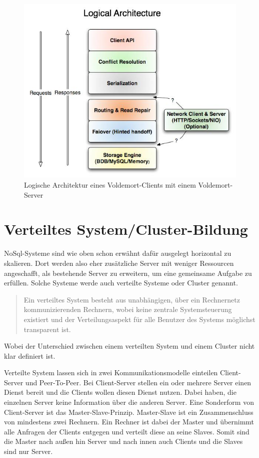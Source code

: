 \begin{figure}
    \centering
    \includegraphics[scale=0.5]{images/voldemort-architecture.jpeg}
    \caption{Logische Architektur eines Voldemort-Clients mit einem Voldemort-Server \cite{Voldemort2017}}
    \label{fig:voldemort-logical-architecture}
\end{figure}

\section{Verteiltes System/Cluster-Bildung}
NoSql-Systeme sind wie oben schon erwähnt dafür ausgelegt horizontal zu
skalieren. Dort werden also eher zusätzliche Server mit weniger Ressourcen
angeschafft, als bestehende Server zu erweitern, um eine gemeinsame Aufgabe zu
erfüllen. Solche Systeme werde auch verteilte Systeme oder Cluster genannt.

\blockquote[\cite{Distener2012}]{Ein verteiltes System besteht aus unabhängigen,
über ein Rechnernetz kommunizierenden Rechnern, wobei keine zentrale
Systemsteuerung existiert und der Verteilungsaspekt für alle Benutzer des
Systems möglichst transparent ist.}

Wobei der Unterschied zwischen einem verteilten System und einem Cluster
nicht klar definiert ist.

Verteilte System lassen sich in zwei Kommunikationsmodelle einteilen
Client-Server und Peer-To-Peer. Bei Client-Server stellen ein oder mehrere
Server einen Dienst bereit und die Clients wollen diesen Dienst nutzen. Dabei
haben, die einzelnen Server keine Information über die anderen Server. Eine
Sonderform von Client-Server ist das Master-Slave-Prinzip. Master-Slave ist ein
Zusammenschluss von mindestens zwei Rechnern. Ein Rechner ist dabei der Master
und übernimmt alle Anfragen der Clients entgegen und verteilt diese an seine
Slaves. Somit sind die Master nach außen hin Server und nach innen auch Clients
und die Slaves sind nur Server.

